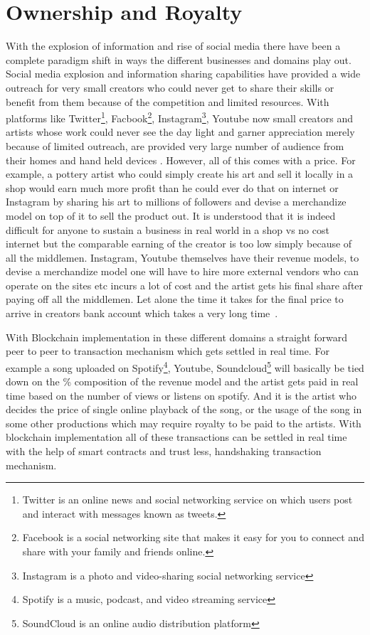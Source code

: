 \section{Ownership and Royalty}

With the explosion of information and rise of social media there have
been a complete paradigm shift in ways the different businesses and
domains play out. Social media explosion and information sharing
capabilities have provided a wide outreach for very small creators who
could never get to share their skills or benefit from them because of
the competition and limited resources. With platforms like
Twitter\footnote{Twitter is an online news and social networking
  service on which users post and interact with messages known as
  tweets.}, Facbook\footnote{Facebook is a social networking site that
  makes it easy for you to connect and share with your family and
  friends online.}, Instagram\footnote{Instagram is a photo and
  video-sharing social networking service}, Youtube now small creators
and artists whose work could never see the day light and garner
appreciation merely because of limited outreach, are provided very
large number of audience from their homes and hand held devices
\cite{saleem24}. However, all of this comes with a price. For example,
a pottery artist who could simply create his art and sell it locally
in a shop would earn much more profit than he could ever do that on
internet or Instagram by sharing his art to millions of followers and
devise a merchandize model on top of it to sell the product out. It is
understood that it is indeed difficult for anyone to sustain a business
in real world in a shop vs no cost internet but the comparable earning
of the creator is too low simply because of all the middlemen.
Instagram, Youtube themselves have their revenue models, to devise a
merchandize model one will have to hire more external vendors who can
operate on the sites etc incurs a lot of cost and the artist gets his
final share after paying off all the middlemen. Let alone the time it
takes for the final price to arrive in creators bank account which
takes a very long time~\cite{margaret25}.

With Blockchain implementation in these different domains a straight
forward peer to peer to transaction mechanism which gets settled in
real time. For example a song uploaded on Spotify\footnote{Spotify is
  a music, podcast, and video streaming service}, Youtube,
Soundcloud\footnote{SoundCloud is an online audio distribution
  platform} will basically be tied down on the \% composition of the
revenue model and the artist gets paid in real time based on the
number of views or listens on spotify. And it is the artist who decides
the price of single online playback of the song, or the usage of the
song in some other productions which may require royalty to be paid to
the artists. With blockchain implementation all of these transactions
can be settled in real time with the help of smart contracts and trust
less, handshaking transaction mechanism.


